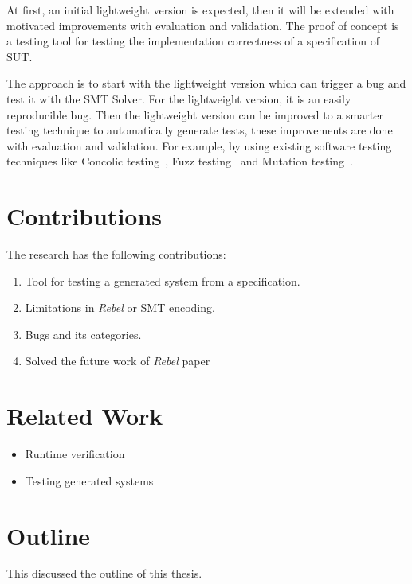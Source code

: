 At first, an initial lightweight version is expected, then it will be extended with motivated
improvements with evaluation and validation. The proof of concept is a testing
tool for testing the implementation correctness of a specification of SUT.

The
approach is to start with the lightweight version which can trigger a bug and
test it with the SMT Solver. For the lightweight version, it is an easily
reproducible bug. Then the lightweight version can be improved to a smarter
testing technique to automatically generate tests, these improvements are done
with evaluation and validation. For example, by using existing software testing
techniques like Concolic testing~\cite{sen2007concolic}, Fuzz testing~\cite{godefroid2008automated} and Mutation testing~\cite{jia2011analysis}.

\section{Contributions}
The research has the following contributions:

\begin{enumerate}
  \item Tool for testing a generated system from a specification.
  \item Limitations in \textit{Rebel} or SMT encoding.
  \item Bugs and its categories.
  \item Solved the future work of \textit{Rebel} paper
\end{enumerate}

\section{Related Work}
\begin{itemize}
  \item Runtime verification
  \item Testing generated systems
\end{itemize}

\section{Outline}
This discussed the outline of this thesis.
